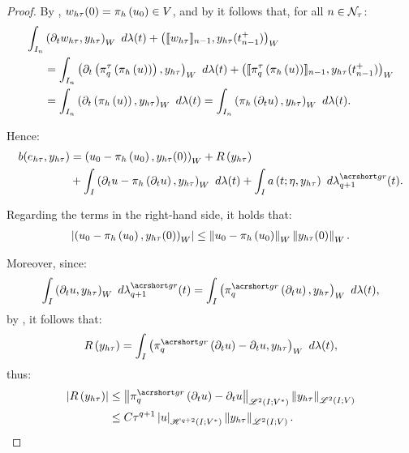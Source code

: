 \begin{proof}
    By , $w_{h \tau}(0) = \pi_h \left( u_0 \right) \in V$, and by  it follows that, for all $n \in \mathcal{N}_{\tau}$:
    \begin{align*}
        \int_{I_n} &\left( \partial_t w_{h \tau}, y_{h \tau}\right)_W ~ d \lambda(t) + \left( \llbracket w_{h \tau} \rrbracket_{n - 1}, y_{h \tau}(t_{n - 1}^+) \right)_W \\
        &= \int_{I_n} \left( \partial_t \left( \pi^{\tau}_q \left( \pi_h \left( u \right) \right) \right), y_{h \tau}\right)_W ~ d \lambda(t) + \left( \llbracket \pi^{\tau}_q \left( \pi_h \left( u \right) \right) \rrbracket_{n - 1}, y_{h \tau}(t_{n - 1}^+) \right)_W \\
        &= \int_{I_n} \left( \partial_t \left( \pi_h \left( u \right) \right), y_{h \tau}\right)_W ~ d \lambda(t) = \int_{I_n} \left( \pi_h \left( \partial_t u \right), y_{h \tau}\right)_W ~ d \lambda(t).
    \end{align*}

    Hence:
    \begin{align*}
        b(e_{h \tau}, y_{h \tau}) &= \left( u_0 - \InterpolantH \left( u_0 \right), y_{h \tau}(0) \right)_W + \Remainder \left( y_{h \tau} \right) \\
        &+ \int_I \left( \partial_t u - \InterpolantH \left( \partial_t u \right), y_{h \tau}\right)_W ~ d \lambda(t) + \int_I a \left( t; \eta, y_{h \tau}\right) ~ d \lambdaGR_{q + 1}(t).
    \end{align*}

    Regarding the terms in the right-hand side, it holds that:
    \begin{align*}
        \left\lvert \left( u_0 - \pi_h \left( u_0 \right), y_{h \tau}(0) \right)_W \right\rvert \leq \left\lVert  u_0 - \pi_h \left( u_0 \right)  \right\rVert_W \left\lVert  y_{h \tau}(0)  \right\rVert_W.
    \end{align*}

    Moreover, since:
    \begin{align*}
        \int_I \left( \partial_t u, y_{h \tau}\right)_W ~ d \lambdaGR_{q + 1}(t) = \int_I \left( \InterpolantGR_q \left( \partial_t u \right), y_{h \tau}\right)_W ~ d \lambda(t),
    \end{align*}
    by , it follows that:
    \begin{align*}
        \Remainder \left( y_{h \tau} \right) = \int_I \left( \InterpolantGR_q \left( \partial_t u \right) - \partial_t u, y_{h \tau}\right)_W ~ d \lambda(t),
    \end{align*}
    thus:
    \begin{align*}
        \left\lvert \Remainder \left( y_{h \tau} \right) \right\rvert &\leq \Norm{ \InterpolantGR_q \left( \partial_t u \right) - \partial_t u }_{\SpaceLp{2}(I; V^*)} \Norm{ y_{h \tau} }_{\SpaceLp{2}(I; V)} \\
        &\leq C \tau^{q + 1} \Seminorm{u}_{\SpaceHk{q + 2}(I; V^*)} \Norm{ y_{h \tau} }_{\SpaceLp{2}(I; V)}.
    \end{align*}


\end{proof}
